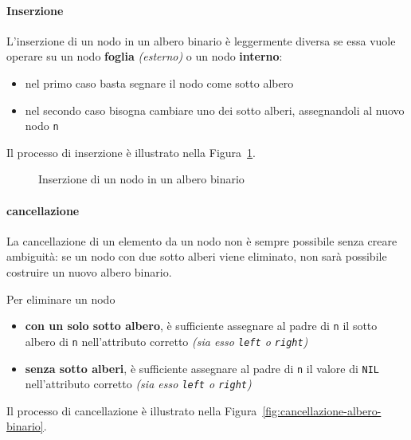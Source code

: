 \documentclass[italian, 10pt]{article}
\begin{document}
\paragraph{Inserzione}
\label{par:inserzione-albero-binario}

L'inserzione di un nodo in un albero binario è leggermente diversa se essa vuole operare su un nodo \textbf{foglia} \textit{(esterno)} o un nodo \textbf{interno}:

\begin{itemize}
  \item nel primo caso basta segnare il nodo come sotto albero
  \item nel secondo caso bisogna cambiare uno dei sotto alberi, assegnandoli al nuovo nodo \texttt{n}
\end{itemize}

\bigskip
Il processo di inserzione è illustrato nella Figura~\ref{fig:inserzione-albero-binario}.

\begin{figure}[htbp]
  \bigskip
  \centering
  \caption{Inserzione di un nodo in un albero binario}
  \label{fig:inserzione-albero-binario}
  \bigskip
\end{figure}

\paragraph{cancellazione}
\label{par:cancellazione-albero-binario}

La cancellazione di un elemento da un nodo non è sempre possibile senza creare ambiguità: se un nodo con due sotto alberi viene eliminato, non sarà possibile costruire un nuovo albero binario.

Per eliminare un nodo

\begin{itemize}
  \item \textbf{con un solo sotto albero}, è sufficiente assegnare al padre di \texttt{n} il sotto albero di \texttt{n} nell'attributo corretto \textit{(sia esso \texttt{left} o \texttt{right})}
  \item \textbf{senza sotto alberi}, è sufficiente assegnare al padre di \texttt{n} il valore di \texttt{NIL} nell'attributo corretto \textit{(sia esso \texttt{left} o \texttt{right})}
\end{itemize}

\bigskip
Il processo di cancellazione è illustrato nella Figura~\ref{fig:cancellazione-albero-binario}.
\end{document}
